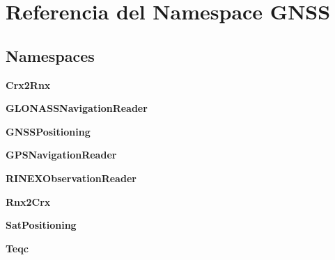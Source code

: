 \section{Referencia del Namespace G\-N\-S\-S}
\label{namespaceGNSS}
\subsection*{Namespaces}
\begin{DoxyCompactItemize}
\item 
{\bf Crx2\-Rnx}
\item 
{\bf G\-L\-O\-N\-A\-S\-S\-Navigation\-Reader}
\item 
{\bf G\-N\-S\-S\-Positioning}
\item 
{\bf G\-P\-S\-Navigation\-Reader}
\item 
{\bf R\-I\-N\-E\-X\-Observation\-Reader}
\item 
{\bf Rnx2\-Crx}
\item 
{\bf Sat\-Positioning}
\item 
{\bf Teqc}
\end{DoxyCompactItemize}
